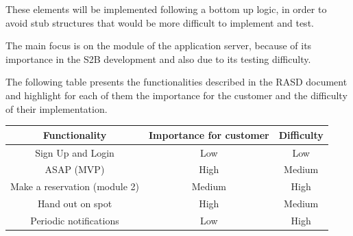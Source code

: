 \documentclass[table, 12pt]{article}
\begin{document}
These elements will be implemented following a bottom up logic, in order to avoid stub structures that would be more difficult to implement and test.

The main focus is on the module of the application server, because of its importance in the S2B development and also due to its testing difficulty.

The following table presents the functionalities described in the RASD document and highlight for each of them the importance for the customer and the difficulty of their implementation.

\begin{center}
    \begin{tabular}{ | c | c | c |}
        \hline
        \textbf{Functionality}        & \textbf{Importance for customer} & \textbf{Difficulty} \\ \hline
        Sign Up and Login             & Low                              & Low                 \\ \hline
        ASAP (MVP)                    & High                             & Medium              \\\hline
        Make a reservation (module 2) & Medium                           & High                \\\hline
        Hand out on spot              & High                             & Medium              \\\hline
        Periodic notifications        & Low                              & High                \\
        \hline
    \end{tabular}
\end{center}

\end{document}
